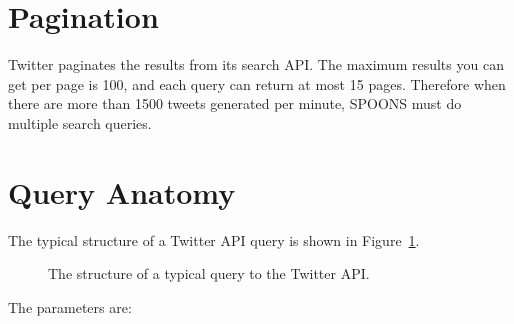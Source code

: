 \documentclass[12pt]{ucthesis}
\newcommand{\captionfonts}{\small\bf\ssp}
\begin{document}
\section{Pagination}
\label{api-pagination}
Twitter paginates the results from its search API. The maximum results you can get per page is 100, and each
query can return at most 15 pages. Therefore when there are more than 1500 tweets generated per minute,
SPOONS must do multiple search queries.

\section{Query Anatomy}
\label{api-anatomy}
The typical structure of a Twitter API query is shown in Figure~\ref{fig:apiQuery}.

\begin{figure}[H]
   \begin{center}
      \captionfonts
      \caption[Twitter API Query]{The structure of a typical query to the Twitter API.}
      \label{fig:apiQuery}
   \end{center}
\end{figure}

The parameters are:
\end{document}
